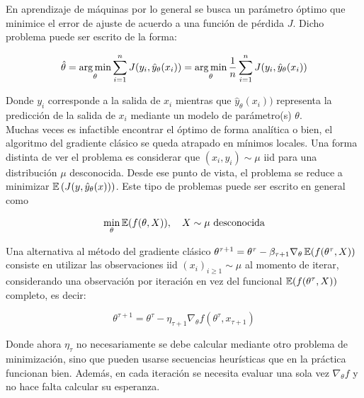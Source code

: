 \begin{mdframed}[style=pendiente, frametitle={\center Método del gradiente estocástico}]

	En aprendizaje de máquinas por lo general se busca un parámetro óptimo que minimice el error de ajuste de acuerdo a una función de pérdida $J$. Dicho problema puede ser escrito de la forma:
	
	\begin{equation}
		\hat{\theta} = \operatorname*{arg\,min}_\theta \sum_{i=1}^n J(y_i,\hat{y}_\theta(x_i)) = \operatorname*{arg\,min}_\theta \frac{1}{n} \sum_{i=1}^n J(y_i,\hat{y}_\theta(x_i))
	\end{equation}
	
	Donde $y_i$ corresponde a la salida de $x_i$ mientras que $\hat{y}_\theta(x_i))$ representa la predicción de la salida de $x_i$ mediante un modelo de parámetro(s) $\theta$.\\
	
	Muchas veces es infactible encontrar el óptimo de forma analítica o bien, el algoritmo del gradiente clásico se queda atrapado en mínimos locales. Una forma distinta de ver el problema es considerar que $(x_i,y_i)\sim\mu$ iid para una distribución $\mu$ desconocida. Desde ese punto de vista, el problema se reduce a minimizar $\operatorname{\mathbb{E}}\left(J(y,\hat{y}_\theta(x))\right)$. Este tipo de problemas puede ser escrito en general como
	
	\begin{equation}
		\min_\theta \operatorname{\mathbb{E}}(f(\theta,X)),\quad X\sim \mu\text{ desconocida}
	\end{equation}

Una alternativa al método del gradiente clásico $\theta^{\tau+1} = \theta^\tau - \beta_{\tau+1}\nabla_\theta \operatorname{\mathbb{E}}(f(\theta^\tau,X))$ consiste en utilizar las observaciones iid $(x_i)_{i\geq 1}\sim\mu$ al momento de iterar, considerando una observación por iteración en vez del funcional $\operatorname{\mathbb{E}}(f(\theta^\tau,X))$ completo, es decir:

\begin{equation}
	\theta^{\tau+1} = \theta^\tau - \eta_{\tau+1}\nabla_\theta f(\theta^\tau,x_{\tau+1})
\end{equation}

Donde ahora $\eta_\tau$ no necesariamente se debe calcular mediante otro problema de minimización, sino que pueden usarse secuencias heurísticas que en la práctica funcionan bien. Además, en cada iteración se necesita evaluar una sola vez $\nabla_\theta f$ y no hace falta calcular su esperanza.\\


\end{mdframed}
